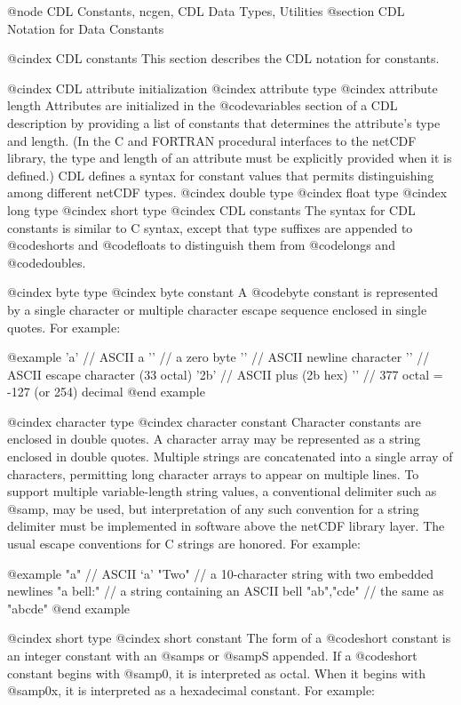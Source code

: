 {@node CDL Constants, ncgen, CDL Data Types, Utilities
@section CDL Notation for Data Constants

@cindex CDL constants
This section describes the CDL notation for constants.

@cindex CDL attribute initialization
@cindex attribute type
@cindex attribute length
Attributes are initialized in the @code{variables} section of a CDL description
by providing a list of constants that determines the attribute's type
and length.  (In the C and FORTRAN procedural interfaces to the netCDF
library, the type and length of an attribute must be explicitly provided
when it is defined.)  CDL defines a
syntax for constant values that permits distinguishing among different
netCDF types.
@cindex double type
@cindex float type
@cindex long type
@cindex short type
@cindex CDL constants
The syntax for CDL constants is similar to C syntax, except that type
suffixes are appended to @code{short}s and @code{float}s to distinguish
them from @code{long}s and @code{double}s.

@cindex byte type
@cindex byte constant
A @code{byte} constant is represented by a single character or multiple
character escape sequence enclosed in single quotes.  For example:

@example
'a'     // ASCII a
'\0'    // a zero byte
'\n'    // ASCII newline character
''   // ASCII escape character (33 octal)
'\x2b'  // ASCII plus (2b hex)
''  // 377 octal = -127 (or 254) decimal
@end example

@cindex character type
@cindex character constant
Character constants are enclosed in double quotes.  A character array
may be represented as a string enclosed in double quotes.  Multiple
strings are concatenated into a single array of characters, permitting
long character arrays to appear on multiple lines.  To support multiple
variable-length string values, a conventional delimiter such as @samp{,}
may be used, but interpretation of any such convention for a string
delimiter must be implemented in software above the netCDF library
layer.  The usual escape conventions for C strings are honored.  For
example:

@example
"a"            // ASCII `a'
"Two\nlines\n" // a 10-character string with two embedded newlines
"a bell:"  // a string containing an ASCII bell
"ab","cde"     // the same as "abcde"
@end example

@cindex short type
@cindex short constant
The form of a @code{short} constant is an integer constant with an
@samp{s} or @samp{S} appended.  If a @code{short} constant begins with
@samp{0}, it is interpreted as octal.  When it begins with
@samp{0x}, it is interpreted as a hexadecimal constant.  For example:

}

